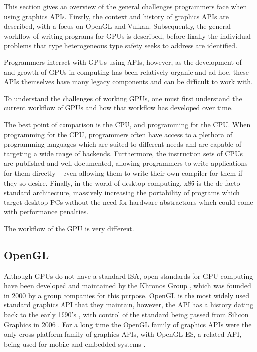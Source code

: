 \documentclass[a4paper,12pt,twoside,openright]{report}
\begin{document}
This section gives an overview of the general challenges programmers face when
using graphics APIs. Firstly, the context and history of graphics APIs are
described, with a focus on OpenGL and Vulkan. Subsequently, the general
workflow of writing programs for GPUs is described, before finally the
individual problems that type heterogeneous type safety seeks to address are
identified.

Programmers interact with GPUs using APIs, however, as the development of and
growth of GPUs in computing has been relatively organic and ad-hoc, these APIs
themselves have many legacy components and can be difficult to work with.

To understand the challenges of working GPUs, one must first understand the
current workflow of GPUs and how that workflow has developed over time.

The best point of comparison is the CPU, and programming for the CPU. When
programming for the CPU, programmers often have access to a plethora of
programming languages which are suited to different needs and are capable of
targeting a wide range of backends. Furthermore, the instruction sets of CPUs
are published and well-documented, allowing programmers to write applications
for them directly -- even allowing them to write their own compiler for them
if they so desire. Finally, in the world of desktop computing, x86 is the
de-facto standard architecture, massively increasing the portability of
programs which target desktop PCs without the need for hardware abstractions
which could come with performance penalties.

The workflow of the GPU is very different.

\subsection{OpenGL}

Although GPUs do not have a standard ISA, open standards for GPU computing have
been developed and maintained by the Khronos Group \cite{TODO}, which was
founded in 2000 by a group companies for this purpose. OpenGL is the most
widely used standard graphics API that they maintain, however, the API has a
history dating back to the early 1990's \cite{TODO}, with control of the
standard being passed from Silicon Graphics in 2006 \cite{TODO}. For a long
time the OpenGL family of graphics APIs were the only cross-platform family of
graphics APIs, with OpenGL ES, a related API, being used for mobile and
embedded systems \cite{TODO}.
\end{document}
